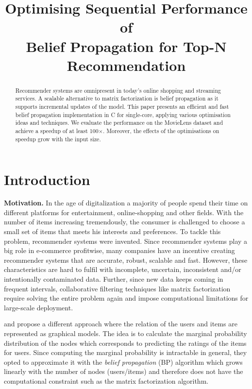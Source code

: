 \documentclass[final,letterpaper]{article}
\title{Optimising Sequential Performance of\\ Belief Propagation for Top-N Recommendation}
\newcommand{\mypar}[1]{{\bf #1.}}
\begin{document}
%
\maketitle
%

\begin{abstract}
Recommender systems are omnipresent in today's online shopping and streaming services. A scalable alternative to matrix factorization is belief propagation as it supports incremental updates of the model. This paper presents an efficient and fast belief propagation implementation in C for single-core, applying various optimisation ideas and techniques. We evaluate the performance on the MovieLens dataset and achieve a speedup of at least 100$\times$. Moreover, the effects of the optimisations on speedup grow with the input size.
\end{abstract}

\section{Introduction}\label{sec:intro}
\mypar{Motivation}
In the age of digitalization a majority of people spend their time on different platforms for entertainment, online-shopping and other fields. With the number of items increasing tremendously, the consumer is challenged to choose a small set of items that meets his interests and preferences. To tackle this problem, recommender systems were invented. Since recommender systems play a big role in e-commerce profitwise, many companies have an incentive creating recommender systems that are accurate, robust, scalable and fast. However, these characteristics are hard to fulfil with incomplete, uncertain, inconsistent and/or intentionally contaminated data. Further, since new data keeps coming in frequent intervals, collaborative filtering techniques like matrix factorization require solving the entire problem again and impose computational limitations for large-scale deployment.

\citet{BPRS} and \citet{top-n-recommendation} propose a different approach where the relation of the users and items are represented as graphical models. The idea is to calculate the marginal probability distribution of the nodes which corresponds to predicting the ratings of the items for users. Since computing the marginal probability is intractable in general, they opted to approximate it with the \emph{belief propagation} (BP) algorithm which grows linearly with the number of nodes (users/items) and therefore does not have the computational constraint such as the matrix factorization algorithm.
\end{document}
